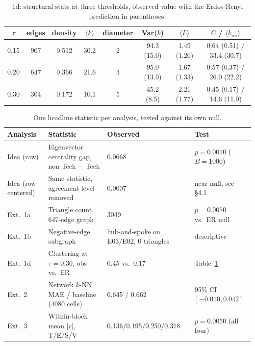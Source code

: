 \documentclass[11pt]{article}
\begin{document}
\begin{table}[htbp]
    \centering
    \caption{1d: structural stats at three thresholds, observed value with the Erdos-Renyi prediction
    in parentheses.}
    \label{tab:structural}
    \footnotesize
    \begin{tabular*}{\textwidth}{@{\extracolsep{\fill}}cccccccc@{}}
        \toprule
        $\tau$ & edges & density & $\langle k \rangle$ & diameter & Var($k$) & $\langle L \rangle$ & $C$ / $\langle k_{nn}\rangle$ \\
        \midrule
        0.15 & 907 & 0.512 & 30.2 & 2 & 94.3 (15.0) & 1.49 (1.20) & 0.64 (0.51) / 33.4 (30.7) \\
        0.20 & 647 & 0.366 & 21.6 & 3 & 95.0 (13.9) & 1.67 (1.33) & 0.57 (0.37) / 26.0 (22.2) \\
        0.30 & 304 & 0.172 & 10.1 & 5 & 45.2 (8.5)  & 2.21 (1.77) & 0.45 (0.17) / 14.6 (11.0) \\
        \bottomrule
    \end{tabular*}
\end{table}

\begin{table}[htbp]
    \centering
    \caption{One headline statistic per analysis, tested against its own null.}
    \label{tab:headline}
    \footnotesize
    \begin{tabularx}{\textwidth}{@{}lXXX@{}}
        \toprule
        Analysis & Statistic & Observed & Test \\
        \midrule
        Idea (raw) & Eigenvector centrality gap, non-Tech $-$ Tech & 0.0668 & $p=0.0010$ ($B{=}1000$) \\
        Idea (row-centered) & Same statistic, agreement level removed & 0.0007 & near null, see \S4.1 \\
        Ext.\ 1a & Triangle count, 647-edge graph & 3049 & $p=0.0050$ vs.\ ER null \\
        Ext.\ 1b & Negative-edge subgraph & hub-and-spoke on E03/E02, 0 triangles & descriptive \\
        Ext.\ 1d & Clustering at $\tau=0.30$, obs vs.\ ER & 0.45 vs.\ 0.17 & Table~\ref{tab:structural} \\
        Ext.\ 2 & Network $k$-NN MAE / baseline (4080 cells) & 0.645 / 0.662 & 95\% CI $[-0.010, 0.042]$ \\
        Ext.\ 3 & Within-block mean $|r|$, T/E/S/V & 0.136/0.195/0.250/0.318 & $p=0.0050$ (all four) \\
        \bottomrule
    \end{tabularx}
\end{table}
\end{document}

